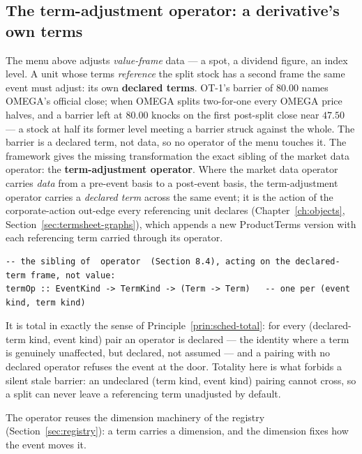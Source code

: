 \documentclass[11pt,a4paper]{article}
\begin{document}
\subsection{The term-adjustment operator: a derivative's own terms}\label{sec:term-operator}

The menu above adjusts \emph{value-frame} data --- a spot, a dividend figure, an index
level. A unit whose terms \emph{reference} the split stock has a second frame the same event
must adjust: its own \textbf{declared terms}. OT-1's barrier of $80.00$ names OMEGA's
official close; when OMEGA splits two-for-one every OMEGA price halves, and a barrier left at
$80.00$ knocks on the first post-split close near $47.50$ --- a stock at half its former level
meeting a barrier struck against the whole. The barrier is a declared term, not data, so
no operator of the menu touches it. The framework gives the missing transformation the exact
sibling of the market data operator: the \textbf{term-adjustment operator}. Where the market
data operator carries \emph{data} from a pre-event basis to a post-event basis, the
term-adjustment operator carries a \emph{declared term} across the same event; it is the
action of the corporate-action out-edge every referencing unit declares
(Chapter~\ref{ch:objects}, Section~\ref{sec:termsheet-graphs}), which appends a new
ProductTerms version with each referencing term carried through its operator.

\begin{lstlisting}
-- the sibling of  operator  (Section 8.4), acting on the declared-term frame, not value:
termOp :: EventKind -> TermKind -> (Term -> Term)   -- one per (event kind, term kind)
\end{lstlisting}

It is total in exactly the sense of Principle~\ref{prin:sched-total}: for every
(declared-term kind, event kind) pair an operator is declared --- the identity where a term
is genuinely unaffected, but declared, not assumed --- and a pairing with no declared operator
refuses the event at the door. Totality here is what forbids a silent stale barrier: an
undeclared (term kind, event kind) pairing cannot cross, so a split can never leave a
referencing term unadjusted by default.

The operator reuses the dimension machinery of the registry (Section~\ref{sec:registry}): a
term carries a dimension, and the dimension fixes how the event moves it.
\end{document}
